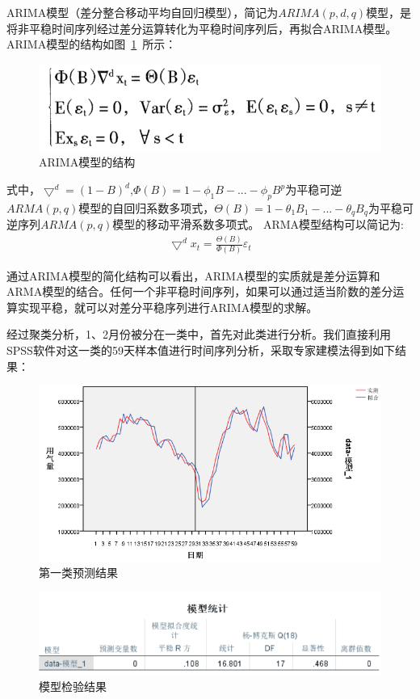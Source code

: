 \documentclass{whutmod}
\begin{document}
	ARIMA模型（差分整合移动平均自回归模型），简记为$ARIMA(p,d,q)$模型，是将非平稳时间序列经过差分运算转化为平稳时间序列后，再拟合ARIMA模型。ARIMA模型的结构如图~\ref{gs}~所示\parencite{conejo2005day}：
	\begin{figure}[H]
		\centering
		\includegraphics[width=.5\textwidth]{figures/gs.png}
		\caption{ARIMA模型的结构}\label{gs}
	\end{figure}
	式中，$\bigtriangledown ^{d}=(1-B)^{d}$,$\Phi \left ( B\right )= 1-\phi _{1}B-...-\phi _{p}B^{p}$为平稳可逆$ARMA(p,q)$模型的自回归系数多项式，$\Theta (B)=1-\theta _{1}B_{1}-...-\theta _{q}B_{q}$为平稳可逆序列$ARMA(p,q)$模型的移动平滑系数多项式\parencite{conejo2005day}。
	ARMA模型结构可以简记为:
	\begin{gather}
	\bigtriangledown^{d}x_{t}=\frac{\Theta (B)}{\Phi(B)}\varepsilon _{t}
	\end{gather}
	
	通过ARIMA模型的简化结构可以看出，ARIMA模型的实质就是差分运算和ARMA模型的结合。任何一个非平稳时间序列，如果可以通过适当阶数的差分运算实现平稳，就可以对差分平稳序列进行ARIMA模型的求解。
	
	经过聚类分析，1、2月份被分在一类中，首先对此类进行分析。我们直接利用SPSS软件对这一类的59天样本值进行时间序列分析，采取专家建模法得到如下结果：
	\begin{figure}[H]
		\centering
		\includegraphics[width=\textwidth]{figures/a.png}
		\caption{第一类预测结果}\label{a}
	\end{figure}
	\begin{figure}[H]
		\centering
		\includegraphics[width=.7\textwidth]{figures/a1.png}
		\caption{模型检验结果}\label{a1}
	\end{figure}
	
\end{document}
